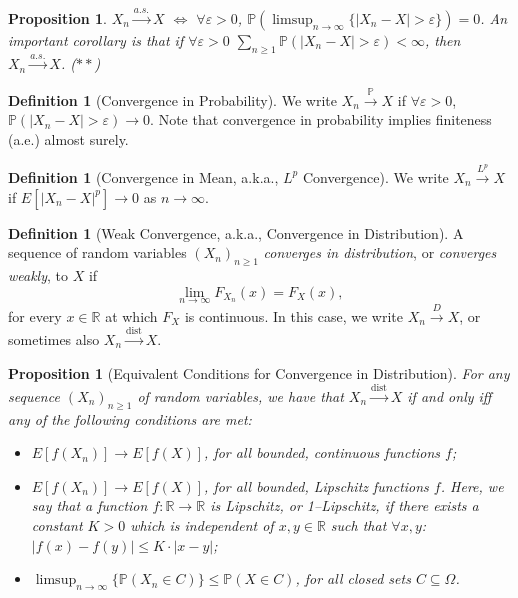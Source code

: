 \documentclass[12pt,reqno]{article}
\renewcommand{\emph}[1]{\textit{#1}}
\theoremstyle{plain}
\newtheorem{prop}[theorem]{Proposition}
\theoremstyle{definition}
\newtheorem{definition}[theorem]{Definition}
\newcommand{\PP}[1]{\ensuremath{\mathbb{P}\left(#1\right)}}
\begin{document}
\begin{prop}
$X_n \xrightarrow{a.s.} X$ $\iff$ $\forall \varepsilon > 0$, 
$\mathbb{P}\left(\limsup_{n \rightarrow \infty} 
     \{|X_n-X| > \varepsilon\}\right) = 0$. 
An important corollary is that if $\forall \varepsilon > 0$ 
$\sum_{n \geq 1} \PP{|X_n - X| > \varepsilon} < \infty$, then 
$X_n \xrightarrow{a.s.} X$. ($\ast\ast$)
\end{prop} 

\begin{definition}[Convergence in Probability]
We write $X_n \xrightarrow{\mathbb{P}} X$ if $\forall \varepsilon > 0$, 
$\mathbb{P}(|X_n-X| > \varepsilon) \rightarrow 0$. Note that convergence in 
probability implies finiteness (a.e.) almost surely. 
\end{definition} 

\begin{definition}[Convergence in Mean, a.k.a., $L^p$ Convergence]
We write $X_n \xrightarrow{L^p} X$ if $E[|X_n-X|^p] \rightarrow 0$ as 
$n \rightarrow \infty$. 
\end{definition} 

\begin{definition}[Weak Convergence, a.k.a., Convergence in Distribution]
A sequence of random variables $(X_n)_{n \geq 1}$ 
\emph{converges in distribution}, or \emph{converges weakly}, to $X$ if 
\[
\lim_{n \rightarrow \infty} F_{X_n}(x) = F_X(x), 
\]
for every $x \in \mathbb{R}$ at which $F_X$ is continuous. 
In this case, we write $X_n \xrightarrow{D} X$, or sometimes also 
$X_n \xrightarrow{\operatorname{dist}} X$. 
\end{definition} 

\begin{prop}[Equivalent Conditions for Convergence in Distribution]
For any sequence $(X_n)_{n \geq 1}$ of random variables, we have that 
$X_n \xrightarrow{\operatorname{dist}} X$ if and only iff any of the 
following conditions are met:
\begin{itemize} 

\item[(a)] $E[f(X_n)] \longrightarrow E[f(X)]$, for all bounded, continuous 
     functions $f$; 
\item[(b)] $E[f(X_n)] \longrightarrow E[f(X)]$, for all bounded, Lipschitz 
     functions $f$. Here, we say that a function $f: \mathbb{R} \rightarrow \mathbb{R}$ is 
     \emph{Lipschitz}, or \emph{1--Lipschitz}, if there exists a constant $K > 0$ which 
     is independent of $x,y \in \mathbb{R}$ such that $\forall x,y$: 
     $|f(x)-f(y)| \leq K \cdot |x-y|$; 
\item[(c)] $\limsup_{n \rightarrow \infty} \{\PP{X_n \in C}\} \leq \PP{X \in C}$, for all 
     closed sets $C \subseteq \Omega$. 

\end{itemize} 
\end{prop} 
\end{document}
